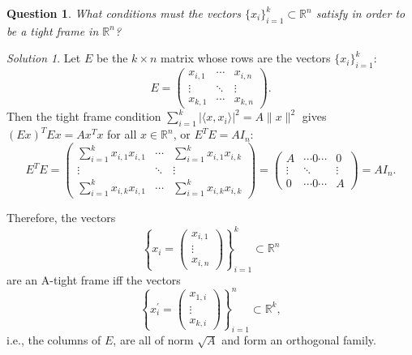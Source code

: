 \documentclass[12pt]{article}
\newtheorem{exer}{Question}
\theoremstyle{remark}
\newtheorem*{soln}{Solution}
\begin{document}
\begin{exer}
What conditions must the vectors $\{x_i\}_{i=1}^k \subset {\mathbb R}^n$ satisfy in order to be a tight frame in ${\mathbb R}^n$?
\end{exer}

\begin{soln}
Let $E$ be the $k \times n$ matrix whose rows are the vectors $\{x_i\}_{i=1}^k$:
$$ 
E =
\begin{pmatrix}
x_{i,1} & \cdots & x_{i, n} \\
\vdots  & \ddots & \vdots \\
x_{k,1} & \cdots & x_{k,n}
\end{pmatrix}.
$$
Then the tight frame condition $\sum_{i=1}^k | \langle x, x_i \rangle |^2 = A \|x\|^2 $ gives $(Ex)^TEx=Ax^Tx$ for all $x \in {\mathbb R}^n$, or $E^TE = AI_n$:
$$
E^TE = 
\begin{pmatrix}
\sum_{i=1}^k x_{i,1} x_{i,1} & \cdots & \sum_{i=1}^k x_{i,1} x_{i,k} \\
\vdots & \ddots & \vdots \\
\sum_{i=1}^k x_{i,k} x_{i, 1} & \cdots & \sum_{i=1}^k x_{i,k} x_{i, k}
\end{pmatrix}
= 
\begin{pmatrix}
A & \cdots 0 \cdots & 0 \\
\vdots & \ddots & \vdots \\
0 & \cdots 0 \cdots & A
\end{pmatrix} = AI_n.
$$

Therefore, the vectors 
$$
\left\{ x_i =
\begin{pmatrix}
x_{i,1} \\
\vdots \\
x_{i,n}
\end{pmatrix}
\right\}_{i=1}^k
\subset {\mathbb R}^n $$ are an A-tight frame iff the vectors
$$
\left\{ x^\prime_i =
\begin{pmatrix}
x_{1,i} \\
\vdots \\
x_{k,i}
\end{pmatrix}
\right\}_{i=1}^n
\subset {\mathbb R}^k,$$ i.e., the columns of $E$, are all of norm $\sqrt{A}$ and form an orthogonal family.
\end{soln}
\end{document}
